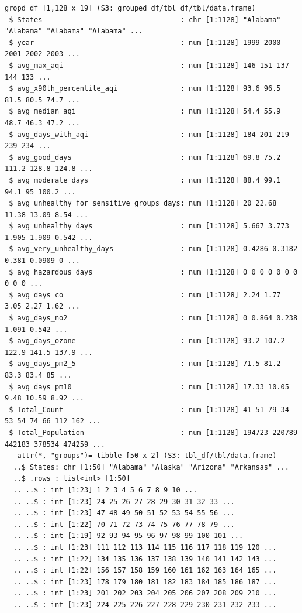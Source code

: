 \documentclass[
  12pt,
]{article}
\begin{document}
\begin{verbatim}
gropd_df [1,128 x 19] (S3: grouped_df/tbl_df/tbl/data.frame)
 $ States                                 : chr [1:1128] "Alabama" "Alabama" "Alabama" "Alabama" ...
 $ year                                   : num [1:1128] 1999 2000 2001 2002 2003 ...
 $ avg_max_aqi                            : num [1:1128] 146 151 137 144 133 ...
 $ avg_x90th_percentile_aqi               : num [1:1128] 93.6 96.5 81.5 80.5 74.7 ...
 $ avg_median_aqi                         : num [1:1128] 54.4 55.9 48.7 46.3 47.2 ...
 $ avg_days_with_aqi                      : num [1:1128] 184 201 219 239 234 ...
 $ avg_good_days                          : num [1:1128] 69.8 75.2 111.2 128.8 124.8 ...
 $ avg_moderate_days                      : num [1:1128] 88.4 99.1 94.1 95 100.2 ...
 $ avg_unhealthy_for_sensitive_groups_days: num [1:1128] 20 22.68 11.38 13.09 8.54 ...
 $ avg_unhealthy_days                     : num [1:1128] 5.667 3.773 1.905 1.909 0.542 ...
 $ avg_very_unhealthy_days                : num [1:1128] 0.4286 0.3182 0.381 0.0909 0 ...
 $ avg_hazardous_days                     : num [1:1128] 0 0 0 0 0 0 0 0 0 0 ...
 $ avg_days_co                            : num [1:1128] 2.24 1.77 3.05 2.27 1.62 ...
 $ avg_days_no2                           : num [1:1128] 0 0.864 0.238 1.091 0.542 ...
 $ avg_days_ozone                         : num [1:1128] 93.2 107.2 122.9 141.5 137.9 ...
 $ avg_days_pm2_5                         : num [1:1128] 71.5 81.2 83.3 83.4 85 ...
 $ avg_days_pm10                          : num [1:1128] 17.33 10.05 9.48 10.59 8.92 ...
 $ Total_Count                            : num [1:1128] 41 51 79 34 53 54 74 66 112 162 ...
 $ Total_Population                       : num [1:1128] 194723 220789 442183 378534 474259 ...
 - attr(*, "groups")= tibble [50 x 2] (S3: tbl_df/tbl/data.frame)
  ..$ States: chr [1:50] "Alabama" "Alaska" "Arizona" "Arkansas" ...
  ..$ .rows : list<int> [1:50] 
  .. ..$ : int [1:23] 1 2 3 4 5 6 7 8 9 10 ...
  .. ..$ : int [1:23] 24 25 26 27 28 29 30 31 32 33 ...
  .. ..$ : int [1:23] 47 48 49 50 51 52 53 54 55 56 ...
  .. ..$ : int [1:22] 70 71 72 73 74 75 76 77 78 79 ...
  .. ..$ : int [1:19] 92 93 94 95 96 97 98 99 100 101 ...
  .. ..$ : int [1:23] 111 112 113 114 115 116 117 118 119 120 ...
  .. ..$ : int [1:22] 134 135 136 137 138 139 140 141 142 143 ...
  .. ..$ : int [1:22] 156 157 158 159 160 161 162 163 164 165 ...
  .. ..$ : int [1:23] 178 179 180 181 182 183 184 185 186 187 ...
  .. ..$ : int [1:23] 201 202 203 204 205 206 207 208 209 210 ...
  .. ..$ : int [1:23] 224 225 226 227 228 229 230 231 232 233 ...

\end{verbatim}
\end{document}
